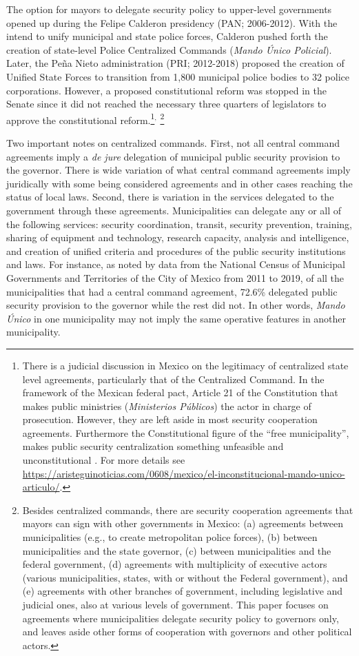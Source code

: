 The option for mayors to delegate security policy to upper-level governments opened up during the Felipe Calderon presidency (PAN; 2006-2012). With the intend to unify municipal and state police forces, Calderon pushed forth the creation of state-level Police Centralized   Commands (\emph{Mando \'Unico Policial}). Later, the Peña Nieto administration (PRI; 2012-2018) proposed the creation of Unified State Forces to transition from 1,800 municipal police bodies to 32 police corporations. However, a proposed constitutional reform was stopped in the Senate since it did not reached the necessary three quarters of legislators to approve the constitutional reform.\footnote{There is a judicial discussion in Mexico on the legitimacy of centralized state level agreements, particularly that of the Centralized Command. In the framework of the Mexican federal pact, Article 21 of the Constitution that makes public ministries (\emph{Ministerios P\'ublicos}) the actor in charge of prosecution. However, they are  left aside in most security cooperation agreements. Furthermore the Constitutional figure of the ``free municipality'', makes public security centralization something unfeasible and unconstitutional \citep{moloeznik_2016}. For more details see \url{https://aristeguinoticias.com/0608/mexico/el-inconstitucional-mando-unico-articulo/}.}$^,$ \footnote{Besides centralized commands, there are security cooperation agreements that mayors can sign with other governments in Mexico: (a) agreements between municipalities (e.g., to create metropolitan police forces), (b) between municipalities and the state governor, (c) between municipalities and the federal government, (d) agreements with multiplicity of executive actors (various municipalities, states, with or without the Federal government), and (e) agreements with other branches of government, including legislative and judicial ones, also at various levels of government. This paper focuses on agreements where municipalities delegate security policy to governors only, and leaves aside other forms of cooperation with governors and other political actors.} 

Two important notes on centralized commands. First, not all central command agreements imply a \emph{de jure} delegation of municipal public security provision to the governor. There is wide variation of what central command agreements imply juridically with some being considered agreements and in other cases reaching the status of local laws. Second, there is variation in the services delegated to the government through these agreements. Municipalities can delegate any or all of the following services: security coordination, transit, security prevention, training, sharing of equipment and technology, research capacity, analysis and intelligence, and creation of unified criteria and procedures of the public security institutions and laws. For instance, as noted by data from the National Census of Municipal Governments and Territories of the City of Mexico from 2011 to 2019, of all the municipalities that had a central command agreement, 72.6\% delegated public security provision to the governor while the rest did not. In other words, \emph{Mando \'Unico} in one municipality may not imply the same operative features in another municipality. 

